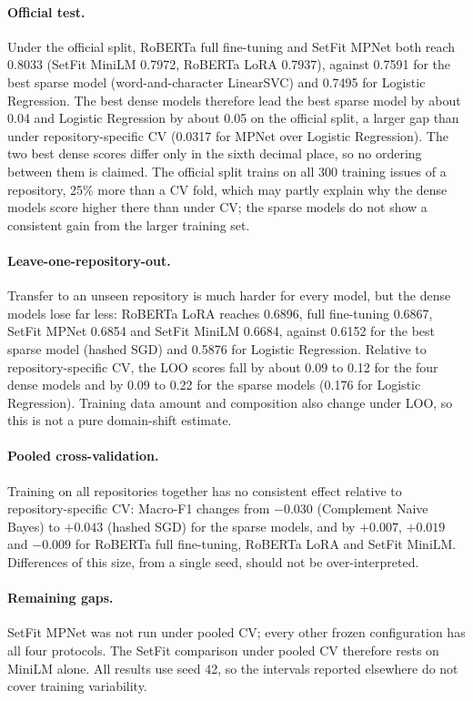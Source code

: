 \paragraph{Official test.} Under the official split, RoBERTa full fine-tuning and SetFit MPNet both reach 0.8033 (SetFit MiniLM 0.7972, RoBERTa LoRA 0.7937), against 0.7591 for the best sparse model (word-and-character LinearSVC) and 0.7495 for Logistic Regression. The best dense models therefore lead the best sparse model by about 0.04 and Logistic Regression by about 0.05 on the official split, a larger gap than under repository-specific CV (0.0317 for MPNet over Logistic Regression). The two best dense scores differ only in the sixth decimal place, so no ordering between them is claimed. The official split trains on all 300 training issues of a repository, 25\% more than a CV fold, which may partly explain why the dense models score higher there than under CV; the sparse models do not show a consistent gain from the larger training set.

\paragraph{Leave-one-repository-out.} Transfer to an unseen repository is much harder for every model, but the dense models lose far less: RoBERTa LoRA reaches 0.6896, full fine-tuning 0.6867, SetFit MPNet 0.6854 and SetFit MiniLM 0.6684, against 0.6152 for the best sparse model (hashed SGD) and 0.5876 for Logistic Regression. Relative to repository-specific CV, the LOO scores fall by about 0.09 to 0.12 for the four dense models and by 0.09 to 0.22 for the sparse models (0.176 for Logistic Regression). Training data amount and composition also change under LOO, so this is not a pure domain-shift estimate.

\paragraph{Pooled cross-validation.} Training on all repositories together has no consistent effect relative to repository-specific CV: Macro-F1 changes from $-0.030$ (Complement Naive Bayes) to $+0.043$ (hashed SGD) for the sparse models, and by $+0.007$, $+0.019$ and $-0.009$ for RoBERTa full fine-tuning, RoBERTa LoRA and SetFit MiniLM. Differences of this size, from a single seed, should not be over-interpreted.

\paragraph{Remaining gaps.} SetFit MPNet was not run under pooled CV; every other frozen configuration has all four protocols. The SetFit comparison under pooled CV therefore rests on MiniLM alone. All results use seed 42, so the intervals reported elsewhere do not cover training variability.

